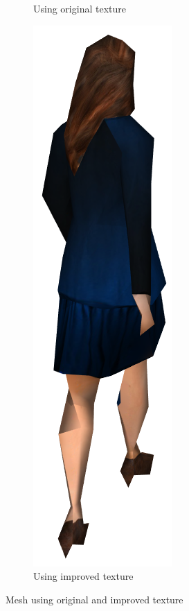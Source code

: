 \begin{figure}[h]
\begin{subfigure}[b]{.2\textwidth}
    \caption{Using original texture}
    \label{fig:using_original_texture}
  \end{subfigure}
  \qquad
  \begin{subfigure}[b]{.2\textwidth}
    \includegraphics[width=\textwidth]{figures/woman_render_improved.png}
    \caption{Using improved texture}
    \label{fig:using_improved_texture}
  \end{subfigure}
  \caption{Mesh using original and improved texture}
  \label{fig:texture_comparison}
\end{figure}

